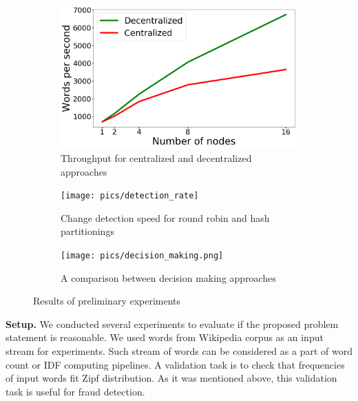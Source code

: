 \label {fs-short-experiments}

\begin{figure}[t!]
    \begin{subfigure}[b]{0.31\textwidth}
            \includegraphics[width=\linewidth]{pics/throughput}
            \caption{Throughput for centralized and decentralized approaches}
            \label{throughput}
    \end{subfigure}%
    \hspace{5mm}
    \begin{subfigure}[b]{0.31\textwidth}
            \texttt{[image: pics/detection\_rate]}
            \caption{Change detection speed for round robin and hash partitionings}
            \label{detection_rate}
    \end{subfigure}%
    \hspace{5mm}
    \begin{subfigure}[b]{0.31\textwidth}
            \texttt{[image: pics/decision\_making.png]}
            \caption{A comparison between decision making approaches}
            \label{decision_making}
    \end{subfigure}%
    \caption{Results of preliminary experiments}
\end{figure}


\indent

{\bf Setup.} We conducted several experiments to evaluate if the proposed problem statement is reasonable. We used words from Wikipedia corpus as an input stream for experiments. Such stream of words can be considered as a part of word count or IDF computing pipelines. A validation task is to check that frequencies of input words fit Zipf distribution. As it was mentioned above, this validation task is useful for fraud detection.

